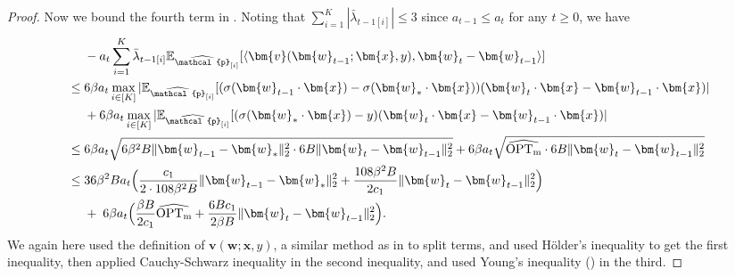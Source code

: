 \documentclass[11pt]{article}
\numberwithin{thm}{section}
\theoremstyle{plain}
\theoremstyle{definition}
\theoremstyle{remark} \newtheorem{remark}[thm]{Remark}
\def\vv{{\bm{v}}}
\def\vw{{\bm{w}}}
\def\vx{{\bm{x}}}
\def\ep{\widehat{\mathcal{p}}}
\newcommand{\E}{\mathbb{E}}
\newcommand{\innp}[1]{\langle #1 \rangle}
\newcommand{\epi}{\ep_{[i]}}
\DeclareMathOperator{\mOPT}{OPT_m}
\newcommand{\mOPThat}{\widehat{\mOPT}}
\begin{document}
\begin{proof}
    Now we bound the fourth term in . Noting that \(\sum_{i=1}^K|\bar{\lambda}_{t-1[i]}|
    \le 3\) since \(a_{t-1}\le a_t\) for any \(t\ge 0\), we have 
    \begin{align}\label{eq:St-term4}
		&-a_t\sum_{i=1}^K\bar{\lambda}_{t-1[i]}\E_{\epi}[\innp{\vv(\vw_{t-1};\vx,y), \vw_t-\vw_{t-1}}] \notag \\ 
        \leq\;& 6\beta a_t \max_{i\in[K]}|\E_{\epi}[(\sigma(\vw_{t-1}\cdot \vx)-\sigma(\vw_*\cdot \vx))(\vw_t\cdot \vx-\vw_{t-1}\cdot \vx)| \notag \\
        &+6\beta a_t\max_{i\in [K]}|\E_{\epi}[(\sigma(\vw_*\cdot \vx)-y)(\vw_t\cdot \vx-\vw_{t-1}\cdot \vx)| \notag \\
        \leq\;& 6\beta a_t\sqrt{6\beta^2B\|\vw_{t-1}-\vw_*\|_2^2\cdot 6B\|\vw_t-\vw_{t-1}\|_2^2}+6\beta a_t\sqrt{\mOPThat \cdot 6B\|\vw_t-\vw_{t-1}\|_2^2} \notag \\
        \leq\;& 36\beta^2Ba_t\Big(\frac{c_1}{2\cdot 108 \beta^2B}\|\vw_{t-1}-\vw_*\|_2^2+\frac{108\beta^2B}{2c_1}\|\vw_t-\vw_{t-1}\|_2^2\Big) \notag \\
        &+ \; 6\beta a_t\Big(\frac{\beta B}{2c_1}\mOPThat +\frac{6Bc_1}{2\beta B}\|\vw_t-\vw_{t-1}\|_2^2\Big).    
    \end{align}
    We again here used the definition of \(\vv(\vw;\vx,y)\), a similar method as in  to split terms, and used H\"older's inequality to get the first inequality, then applied Cauchy-Schwarz inequality in the second inequality, and used Young's inequality () in the third. 
    

\end{proof}
\end{document}
